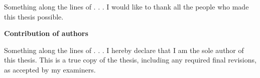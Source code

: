 Something along the lines of . . . I would like to thank all the people who made this thesis possible.
\cleardoublepage

 \begin{center}\textbf{Contribution of authors}\end{center}
  
 \noindent
Something along the lines of . . . I hereby declare that I am the sole author of this thesis. This is a true copy of the thesis, including any required final revisions, as accepted by my examiners.

\cleardoublepage





